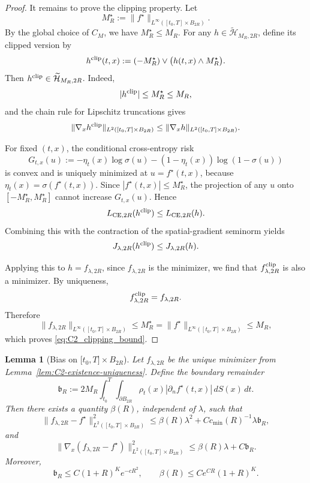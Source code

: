 \documentclass[11pt]{article}
\theoremstyle{plain}
\newtheorem{lemma}[theorem]{Lemma}
\theoremstyle{definition}
\theoremstyle{remark}
\begin{document}
\begin{proof}
It remains to prove the clipping property. Let
\[
M_R^\star:=\|f^\star\|_{L^\infty([t_0,T]\times B_{2R})}.
\]
By the global choice of \(C_M\), we have \(M_R^\star\le M_R\). For any
\(h\in\widetilde{\mathcal H}_{M_R,2R}\), define its clipped version by
\[
h^{\rm clip}(t,x):=
(-M_R^\star)\vee\bigl(h(t,x)\wedge M_R^\star\bigr).
\]
Then \(h^{\rm clip}\in\widetilde{\mathcal H}_{M_R,2R}\). Indeed,
\[
|h^{\rm clip}|\le M_R^\star\le M_R,
\]
and the chain rule for Lipschitz truncations gives
\[
\|\nabla_x h^{\rm clip}\|_{L^2([t_0,T]\times B_{2R})}
\le
\|\nabla_x h\|_{L^2([t_0,T]\times B_{2R})}.
\]


For fixed \((t,x)\), the conditional cross-entropy risk
\[
G_{t,x}(u):=-\eta_t(x)\log\sigma(u)-(1-\eta_t(x))\log(1-\sigma(u))
\]
is convex and is uniquely minimized at \(u=f^\star(t,x)\), because
\(\eta_t(x)=\sigma(f^\star(t,x))\). Since
\(|f^\star(t,x)|\le M_R^\star\), the projection of any \(u\) onto
\([-M_R^\star,M_R^\star]\) cannot increase \(G_{t,x}(u)\).
 Hence
\[
L_{{\rm CE},2R}(h^{\rm clip})
\le
L_{{\rm CE},2R}(h).
\]
Combining this with the contraction of the spatial-gradient seminorm yields
\[
J_{\lambda,2R}(h^{\rm clip})
\le
J_{\lambda,2R}(h).
\]

Applying this to \(h=f_{\lambda,2R}\), since $f_{\lambda,2R}$ is the minimizer, we find that
\(f_{\lambda,2R}^{\rm clip}\) is also a minimizer. By uniqueness,
\[
f_{\lambda,2R}^{\rm clip}=f_{\lambda,2R}.
\]
Therefore
\[
\|f_{\lambda,2R}\|_{L^\infty([t_0,T]\times B_{2R})}
\le
M_R^\star
=
\|f^\star\|_{L^\infty([t_0,T]\times B_{2R})}
\le
M_R,
\]
which proves \eqref{eq:C2_clipping_bound}.
\end{proof}

\begin{lemma}[Bias on \(\lbrack t_0,T\rbrack\times B_{2R}\)]
\label{lem:C3-bias}
Let \(f_{\lambda,2R}\) be the unique minimizer from
Lemma~\ref{lem:C2-existence-uniqueness}. Define the boundary remainder
\[
\mathfrak b_R:=
2M_R
\int_{t_0}^T
\int_{\partial B_{2R}}
\rho_t(x)|\partial_n f^\star(t,x)|\,dS(x)\,dt.
\]
Then there exists a quantity \(\beta(R)\), independent of \(\lambda\), such that
\begin{equation}
\label{eq:C3_bias_L2_beta}
\|f_{\lambda,2R}-f^\star\|_{L^2([t_0,T]\times B_{2R})}^2
\le
\beta(R)\lambda^2
+
C c_{\min}(R)^{-1}\lambda\mathfrak b_R,
\end{equation}
and
\begin{equation}
\label{eq:C3_bias_grad_beta}
\|\nabla_x(f_{\lambda,2R}-f^\star)\|_{L^2([t_0,T]\times B_{2R})}^2
\le
\beta(R)\lambda
+
C\mathfrak b_R.
\end{equation}
Moreover,
\begin{equation}
\label{eq:C3_beta_boundary_growth}
\mathfrak b_R\le C(1+R)^K e^{-cR^2},
\qquad
\beta(R)\le C e^{CR}(1+R)^K.
\end{equation}
\end{lemma}
\end{document}
